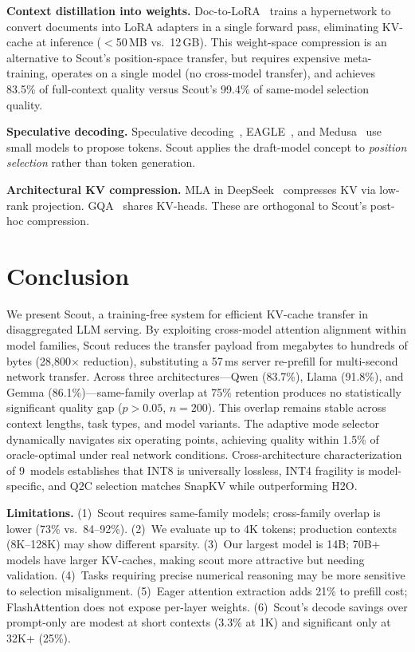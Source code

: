 \documentclass{article}
\newcommand{\QtoC}{\textsc{Q2C}\xspace}
\begin{document}
\textbf{Context distillation into weights.}
Doc-to-LoRA~\citep{d2l} trains a hypernetwork to convert documents into LoRA adapters in a single forward pass, eliminating KV-cache at inference ($<$50\,MB vs.\ 12\,GB).
This weight-space compression is an alternative to Scout's position-space transfer, but requires expensive meta-training, operates on a single model (no cross-model transfer), and achieves 83.5\% of full-context quality versus Scout's 99.4\% of same-model selection quality.

\textbf{Speculative decoding.}
Speculative decoding~\citep{speculativedecoding}, EAGLE~\citep{eagle}, and Medusa~\citep{medusa} use small models to propose tokens.
Scout applies the draft-model concept to \emph{position selection} rather than token generation.

\textbf{Architectural KV compression.}
MLA in DeepSeek~\citep{deepseek} compresses KV via low-rank projection.
GQA~\citep{gqa} shares KV-heads.
These are orthogonal to Scout's post-hoc compression.


\section{Conclusion}
\label{sec:conclusion}

We present Scout, a training-free system for efficient KV-cache transfer in disaggregated LLM serving.
By exploiting cross-model attention alignment within model families, Scout reduces the transfer payload from megabytes to hundreds of bytes (28{,}800$\times$ reduction), substituting a 57\,ms server re-prefill for multi-second network transfer.
Across three architectures---Qwen (83.7\%), Llama (91.8\%), and Gemma (86.1\%)---same-family overlap at 75\% retention produces no statistically significant quality gap ($p > 0.05$, $n = 200$).
This overlap remains stable across context lengths, task types, and model variants.
The adaptive mode selector dynamically navigates six operating points, achieving quality within 1.5\% of oracle-optimal under real network conditions.
Cross-architecture characterization of 9~models establishes that INT8 is universally lossless, INT4 fragility is model-specific, and \QtoC selection matches SnapKV while outperforming H2O.

\textbf{Limitations.}
(1)~Scout requires same-family models; cross-family overlap is lower (73\% vs.\ 84--92\%).
(2)~We evaluate up to 4K tokens; production contexts (8K--128K) may show different sparsity.
(3)~Our largest model is 14B; 70B+ models have larger KV-caches, making scout more attractive but needing validation.
(4)~Tasks requiring precise numerical reasoning may be more sensitive to selection misalignment.
(5)~Eager attention extraction adds 21\% to prefill cost; FlashAttention does not expose per-layer weights.
(6)~Scout's decode savings over prompt-only are modest at short contexts (3.3\% at 1K) and significant only at 32K+ (25\%).
\end{document}
